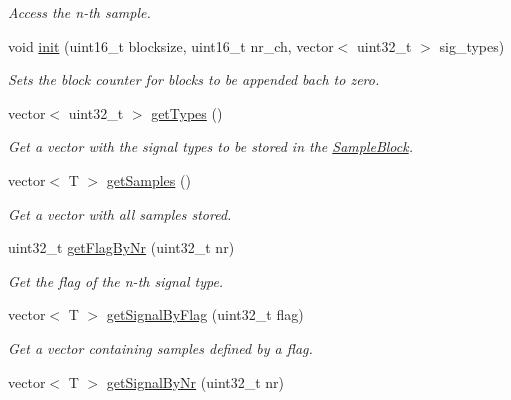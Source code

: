 \begin{DoxyCompactItemize}
\begin{DoxyCompactList}\small\item\em Access the n-\/th sample. \item\end{DoxyCompactList}\item 
void \hyperlink{class_sample_block_aaa6f432732f41a4442aa5c686a47d1ff}{init} (uint16\_\-t blocksize, uint16\_\-t nr\_\-ch, vector$<$ uint32\_\-t $>$ sig\_\-types)
\begin{DoxyCompactList}\small\item\em Sets the block counter for blocks to be appended bach to zero. \item\end{DoxyCompactList}\item 
vector$<$ uint32\_\-t $>$ \hyperlink{class_sample_block_a88392883021407912963d869b7327c64}{getTypes} ()
\begin{DoxyCompactList}\small\item\em Get a vector with the signal types to be stored in the \hyperlink{class_sample_block}{SampleBlock}. \item\end{DoxyCompactList}\item 
vector$<$ T $>$ \hyperlink{class_sample_block_ab1764078cb18780d0d134494ee8aeb9e}{getSamples} ()
\begin{DoxyCompactList}\small\item\em Get a vector with all samples stored. \item\end{DoxyCompactList}\item 
uint32\_\-t \hyperlink{class_sample_block_ac07d28e24acdb26340ad96f7810be414}{getFlagByNr} (uint32\_\-t nr)
\begin{DoxyCompactList}\small\item\em Get the flag of the n-\/th signal type. \item\end{DoxyCompactList}\item 
vector$<$ T $>$ \hyperlink{class_sample_block_a2a2d427f69288002f5c5512f9e9a3d83}{getSignalByFlag} (uint32\_\-t flag)
\begin{DoxyCompactList}\small\item\em Get a vector containing samples defined by a flag. \item\end{DoxyCompactList}\item 
vector$<$ T $>$ \hyperlink{class_sample_block_a1a6a7cf636807d2c3595031ca4d5cbed}{getSignalByNr} (uint32\_\-t nr)

\end{DoxyCompactItemize}
